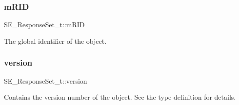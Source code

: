 \subsubsection{\texorpdfstring{m\+R\+ID}{mRID}}
{\footnotesize\ttfamily S\+E\+\_\+\+Response\+Set\+\_\+t\+::m\+R\+ID}

The global identifier of the object. \mbox{\label{group__ResponseSet_gaefb52ca508dcbeaba72f17886899d590}} 
\subsubsection{\texorpdfstring{version}{version}}
{\footnotesize\ttfamily S\+E\+\_\+\+Response\+Set\+\_\+t\+::version}

Contains the version number of the object. See the type definition for details. 